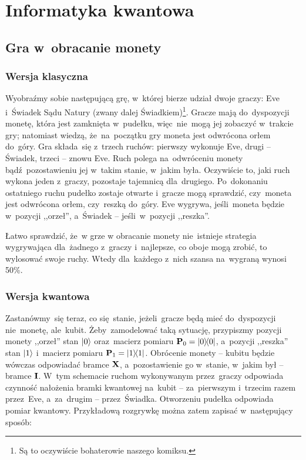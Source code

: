 \chapter{Informatyka kwantowa}

\section{Gra w~obracanie monety}
\subsection{Wersja klasyczna}
Wyobraźmy sobie następującą grę, w~której bierze udział dwoje graczy:
Eve i~Świadek Sądu Natury (zwany dalej Świadkiem)\footnote{Są to
	oczywiście bohaterowie naszego komiksu.}. Gracze mają do~dyspozycji
monetę, która jest zamknięta w~pudełku, więc~nie~mogą jej zobaczyć
w~trakcie gry; natomiast wiedzą, że~na~początku gry moneta jest
odwrócona orłem do~góry. Gra składa~się z~trzech ruchów: pierwszy
wykonuje Eve, drugi -- Świadek, trzeci -- znowu Eve. Ruch polega
na~odwróceniu monety bądź~pozostawieniu jej w~takim stanie, w~jakim
była. Oczywiście to, jaki ruch wykona jeden z~graczy, pozostaje
tajemnicą dla~drugiego. Po~dokonaniu ostatniego ruchu pudełko zostaje
otwarte i~gracze mogą sprawdzić, czy~moneta jest odwrócona orłem,
czy~reszką do~góry. Eve wygrywa, jeśli~moneta będzie w~pozycji
,,orzeł'', a~Świadek -- jeśli~w~pozycji ,,reszka''.

Łatwo sprawdzić, że~w grze w obracanie monety nie~istnieje strategia
wygrywająca dla~żadnego z~graczy i~najlepsze, co oboje mogą zrobić, to
wylosować swoje ruchy. Wtedy dla~każdego z~nich szansa na~wygraną wynosi
50\%.

\subsection{Wersja kwantowa}
Zastanówmy~się teraz, co się~stanie, jeżeli~gracze będą mieć do~dyspozycji nie~monetę,
ale~kubit.
Żeby~zamodelować taką sytuację, przypiszmy pozycji monety ,,orzeł'' stan $\ket{0}$ oraz~macierz
pomiaru $\mathbf{P}_0=\ketbra{0}{0}$, a~pozycji ,,reszka''
stan $\ket{1}$ i~macierz pomiaru $\mathbf{P}_1=\ketbra{1}{1}$. Obrócenie monety --
kubitu będzie wówczas odpowiadać bramce $\mathbf{X}$, a~pozostawienie go w~stanie, w~jakim był
-- bramce $\mathbf{I}$. W~tym schemacie ruchom wykonywanym przez~graczy odpowiada czynność nałożenia bramki
kwantowej na~kubit -- za~pierwszym i~trzecim razem przez~Eve, a~za~drugim -- przez~Świadka.
Otworzeniu pudełka odpowiada pomiar kwantowy.
Przykładową rozgrywkę można zatem zapisać w~następujący sposób:

